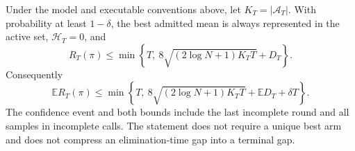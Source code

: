 \begin{theorem}
\label{thm:ucbaa_fixed_budget}
Under the model and executable conventions above, let
$K_T=|\mathcal A_T|$. With probability at least $1-\delta$, the best
admitted mean is always represented in the active set, $\mathcal H_T=0$, and
\begin{equation}
 R_T(\pi)\le
 \min\left\{T,\ 8\sqrt{(2\log N+1)K_TT}+D_T\right\}.
 \label{eq:ucbaa_fixed_hp}
\end{equation}
Consequently
\begin{equation}
 \mathbb E R_T(\pi)\le
 \min\left\{T,\ 8\sqrt{(2\log N+1)K_TT}
                   +\mathbb E D_T+\delta T\right\}.
 \label{eq:ucbaa_fixed_expectation}
\end{equation}
The confidence event and both bounds include the last incomplete round and
all samples in incomplete calls. The statement does not require a unique
best arm and does not compress an elimination-time gap into a terminal gap.
\end{theorem}

